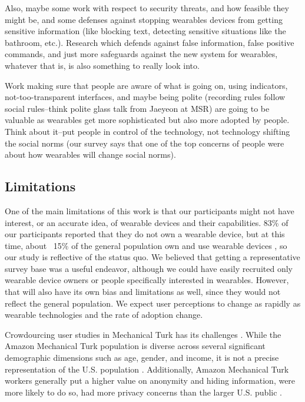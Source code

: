 \documentclass{acm_proc_article-sp}
\begin{document}
 Also, maybe some work with respect to security threats, and how feasible they might be, and some defenses against stopping wearables devices from getting sensitive information (like blocking text, detecting sensitive situations like the bathroom, etc.). Research which defends against false information, false positive commands, and just more safeguards against the new system for wearables, whatever that is, is also something to really look into. 
 
 Work making sure that people are aware of what is going on, using indicators, not-too-transparent interfaces, and maybe being polite (recording rules follow social rules--think polite glass talk from Jaeyeon at MSR) are going to be valuable as wearables get more sophisticated but also more adopted by people. Think about it--put people in control of the technology, not technology shifting the social norms (our survey says that one of the top concerns of people were about how wearables will change social norms). 

\subsection{Limitations}
One of the main limitations of this work is that our participants might not have interest, or an accurate idea, of wearable devices and their capabilities. 83\% of our participants reported that they do not own a wearable device, but at this time, about ~15\% of the general population own and use wearable devices \cite{Nilsen}\cite{WearableStatNews}, so our study is reflective of the status quo. We believed that getting a representative survey base was a useful endeavor, although we could have easily recruited only wearable device owners or people specifically interested in wearables. However, that will also have its own bias and limitations as well, since they would not reflect the general population. We expect user perceptions to change as rapidly as wearable technologies and the rate of adoption change. 

Crowdourcing user studies in Mechanical Turk has its challenges \cite{kittur2008crowdsourcing}. While the Amazon Mechanical Turk population is diverse across several significant demographic dimensions such as age, gender, and income, it is not a precise representation of the U.S. population \cite{ross2010crowdworkers}\cite{kelley2010conducting}. Additionally, Amazon Mechanical Turk workers generally put a higher value on anonymity and hiding information, were more likely to do so, had more privacy concerns than the larger U.S. public \cite{kang2014privacy}. 
\end{document}
